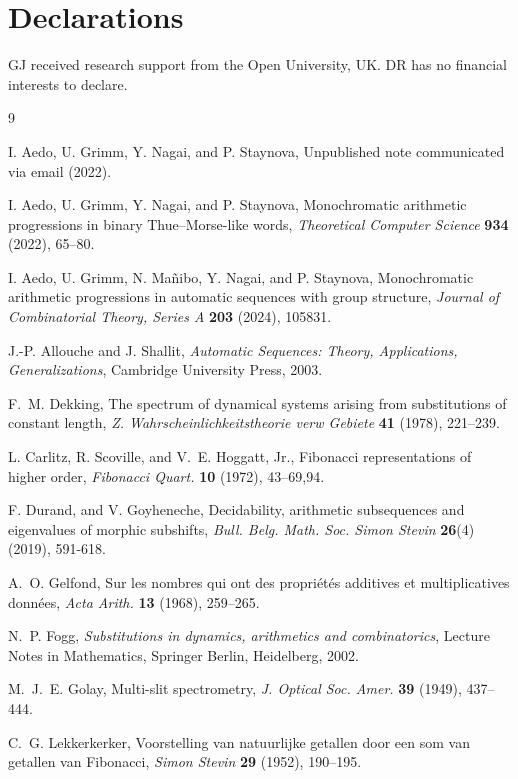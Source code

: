 \documentclass[10pt,a4paper,reqno]{amsart}
\begin{document}
\section*{Declarations}
GJ received research support from the Open University, UK.
DR has no financial interests to declare.

\begin{thebibliography}{9}

 I. Aedo, U. Grimm, Y. Nagai, and P. Staynova, Unpublished note communicated via email (2022).

  I. Aedo, U. Grimm, Y. Nagai, and P. Staynova, Monochromatic arithmetic progressions in binary Thue–Morse-like words, {\it Theoretical Computer Science} \textbf{934} (2022), 65--80.

 I. Aedo, U. Grimm, N. Ma\~nibo, Y. Nagai, and P. Staynova, Monochromatic arithmetic progressions in automatic sequences with group structure, {\it Journal of Combinatorial Theory, Series A} \textbf{203} (2024), 105831.

 J.-P. Allouche and J. Shallit, {\it Automatic Sequences: Theory, Applications, Generalizations}, Cambridge University Press, 2003.

F.~M. Dekking, The spectrum of dynamical systems arising from substitutions of constant length, {\it Z. Wahrscheinlichkeitstheorie verw Gebiete} {\bf 41} (1978), 221–239.

 L. Carlitz, R. Scoville, and V.~E. Hoggatt, Jr., Fibonacci representations of higher order, {\it Fibonacci Quart.} {\bf 10} (1972), 43--69,94.

F. Durand, and V. Goyheneche, Decidability, arithmetic subsequences and eigenvalues of morphic subshifts,  {\it Bull. Belg. Math. Soc. Simon Stevin} {\bf 26}(4) (2019), 591-618.

A.~O. Gelfond, Sur les nombres qui ont des propri\'et\'es additives et multiplicatives donn\'ees, {\it Acta Arith.} {\bf 13} (1968), 259--265.

N.~P. Fogg, {\it Substitutions in dynamics, arithmetics and combinatorics}, Lecture Notes in Mathematics, Springer Berlin, Heidelberg, 2002.

 M.~J.~E. Golay, Multi-slit spectrometry, {\it J. Optical Soc. Amer.} {\bf 39} (1949), 437--444.

  C.~G. Lekkerkerker, Voorstelling van natuurlijke getallen door een som van getallen van Fibonacci, {\it Simon Stevin} \textbf{29} (1952), 190--195.


\end{thebibliography}
\end{document}
